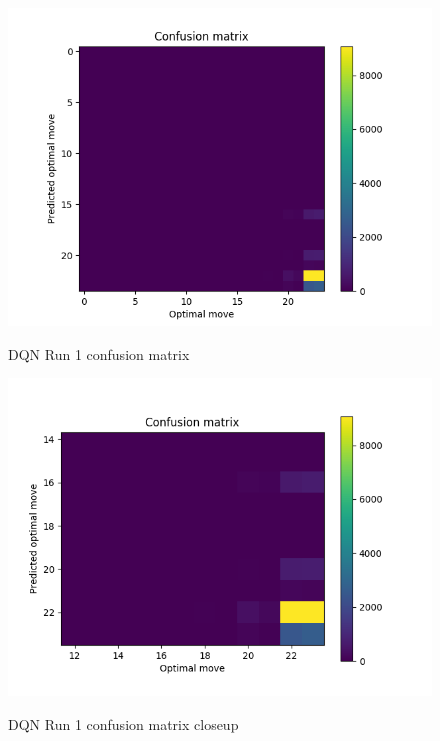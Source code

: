 \begin{figure}
\caption{DQN Run 1 confusion matrix}
\centering
\includegraphics[scale=1]{cm1.png}\\
\end{figure}

\begin{figure}
\caption{DQN Run 1 confusion matrix closeup}
\centering
\includegraphics[scale=1]{cm2.png}\\
\end{figure}

